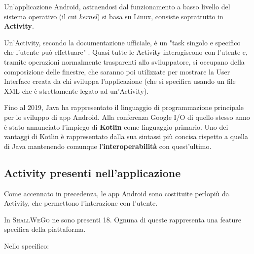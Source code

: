             Un'applicazione Android, astraendosi dal funzionamento a basso livello del sistema operativo (il cui \textit{kernel}) si basa su Linux, consiste soprattutto in \textbf{Activity}.

            Un'Activity, secondo la documentazione ufficiale, è un "task singolo e specifico che l'utente può effettuare" \cite{AndroidDoc}. Quasi tutte le Activity interagiscono con l'utente e, tramite operazioni normalmente trasparenti allo sviluppatore, si occupano della composizione delle finestre, che saranno poi utilizzate per mostrare la User Interface creata da chi sviluppa l'applicazione (che si specifica usando un file XML che è strettamente legato ad un'Activity).

            Fino al 2019, Java ha rappresentato il linguaggio di programmazione principale per lo sviluppo di app Android. Alla conferenza Google I/O di quello stesso anno è stato annunciato l'impiego di \textbf{Kotlin} come linguaggio primario. Uno dei vantaggi di Kotlin è rappresentato dalla sua sintassi più concisa rispetto a quella di Java mantenendo comunque l'\textbf{interoperabilità} con quest'ultimo.
        
        \subsection{Activity presenti nell'applicazione}
            Come accennato in precedenza, le app Android sono costituite perlopiù da Activity, che permettono l'interazione con l'utente.

            In \textsc{ShallWeGo} ne sono presenti 18. Ognuna di queste rappresenta una feature specifica della piattaforma.

            Nello specifico:

